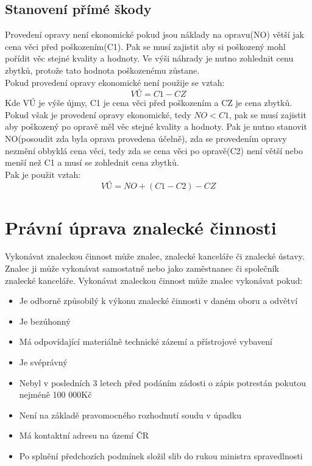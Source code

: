 \subsection{Stanovení přímé škody}
Provedení opravy není ekonomické pokud jsou náklady na opravu(NO) větší jak cena věci před poškozením(C1). Pak se musí zajistit aby si poškozený mohl
pořídit věc stejné kvality a hodnoty. Ve výši náhrady je nutno zohlednit cenu zbytků, protože tato hodnota poškozenému zůstane.\\
Pokud provedení opravy ekonomické není použije se vztah:
\begin{equation}
    VÚ = C1 - CZ
\end{equation}
Kde VÚ je výše újmy, C1 je cena věci před poškozením a CZ je cena zbytků.\\

Pokud však je provedení opravy ekonomické, tedy \(NO < C1\), pak se musí zajistit aby poškozený po opravě měl věc stejné kvality a hodnoty. Pak je nutno
stanovit NO(posoudit zda byla oprava provedena účelně), zda se provedením opravy nezmění obbyklá cena věci, tedy zda se cena věci po opravě(C2) není větší
nebo menší než C1 a musí se zohlednit cena zbytků.\\
Pak je použit vztah:\\
\begin{equation}
    VÚ = NO + (C1 - C2) - CZ
\end{equation}

\section{Právní úprava znalecké činnosti}
Vykonávat znaleckou činnost může znalec, znalecké kanceláře či znalecké ústavy. Znalec ji může vykonávat samostatně nebo jako zaměstnanec či společník
znalecké kanceláře.
Vykonávat znaleckou činnost může znalec vykonávat pokud:
\begin{itemize}
    \item Je odborně způsobilý k výkonu znalecké činnosti v daném oboru a odvětví
    \item Je bezúhonný
    \item Má odpovídající materiálně technické zázemí a přístrojové vybavení
    \item Je svéprávný
    \item Nebyl v posledních 3 letech před podáním zádosti o zápis potrestán pokutou nejméně 100 000Kč
    \item Není na základě pravomocného rozhodnutí soudu v úpadku
    \item Má kontaktní adresu na území ČR 
    \item Po splnění předchozích podmínek složil slib do rukou ministra spravedlnosti
\end{itemize}

